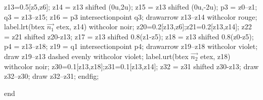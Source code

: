 \documentclass[12pt]{article}
\begin{document}
 z13=0.5[z5,z6];
z14 = z13 shifted (0u,2u);
 z15 = z13 shifted (0u,-2u);
 p3 = z0--z1;
 q3 = z13--z15;
 z16 = p3 intersectionpoint q3;
 drawarrow z13--z14 withcolor rouge;
 label.lrt(btex $\overrightarrow{n_1}$ etex, z14) withcolor noir;
 z20=0.2[z13,z6];z21=0.2[z13,z14];
 z22 = z21 shifted z20-z13;
 z17 = z13 shifted 0.8(z1-z5);
 z18 = z13 shifted 0.8(z0-z5);
 p4 = z13--z18;
 z19 = q1 intersectionpoint p4;
 drawarrow z19--z18  withcolor violet;
 draw z19--z13 dashed evenly withcolor violet;
label.urt(btex $\overrightarrow{n_2}$ etex, z18) withcolor noir;
 z30=0.1[z13,z18];z31=0.1[z13,z14];
 z32 = z31 shifted z30-z13;
 draw z32--z30;
draw z32--z31;
 endfig;



end
\end{document}
